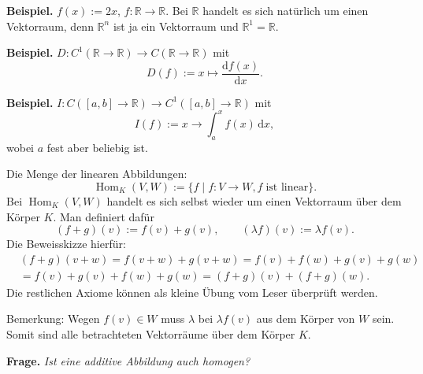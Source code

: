 \documentclass[a4paper,11pt,fleqn,twoside]{scrartcl}
\numberwithin{equation}{section}
\newcommand{\R}{\mathbb R}
\newcommand{\strong}[1]{{\sf\bfseries #1}}
\begin{document}
\strong{Beispiel.} $f(x):=2x$, $f\colon\R\to\R$. Bei $\R$ handelt
es sich natürlich um einen Vektorraum, denn $\R^n$ ist ja ein
Vektorraum und $\R^1=\R$.

\strong{Beispiel.} $D\colon C^1(\R\to\R)\to C(\R\to\R)$ mit
\begin{equation}
D(f):=x\mapsto\frac{\mathrm df(x)}{\mathrm dx}.
\end{equation}

\strong{Beispiel.} $I\colon C([a,b]\to\R)\to C^1([a,b]\to\R)$ mit
\begin{equation}
I(f):=x\to\int_a^x f(x)\,\mathrm dx,
\end{equation}
wobei $a$ fest aber beliebig ist.

Die Menge der linearen Abbildungen:
\begin{equation}
\operatorname{Hom}_K(V,W)
:= \{f\mid f\colon V\to W, f\;\text{ist linear}\}.
\end{equation}
Bei $\operatorname{Hom}_K(V,W)$ handelt es sich selbst wieder
um einen Vektorraum über dem Körper $K$. Man definiert dafür
\begin{equation}
(f+g)(v) := f(v)+g(v),\qquad
(\lambda f)(v) := \lambda f(v).
\end{equation}
Die Beweisskizze hierfür:
\[\begin{split}
&(f+g)(v+w) = f(v+w)+g(v+w) = f(v)+f(w)+g(v)+g(w)\\
&= f(v)+g(v)+f(w)+g(w) = (f+g)(v)+(f+g)(w).
\end{split}\]
Die restlichen Axiome können als kleine Übung vom Leser
überprüft werden.

Bemerkung: Wegen $f(v)\in W$ muss $\lambda$ bei $\lambda f(v)$ aus
dem Körper von $W$ sein. Somit sind alle betrachteten Vektorräume
über dem Körper $K$.

\strong{Frage.} \emph{Ist eine additive Abbildung auch homogen?}
\end{document}
